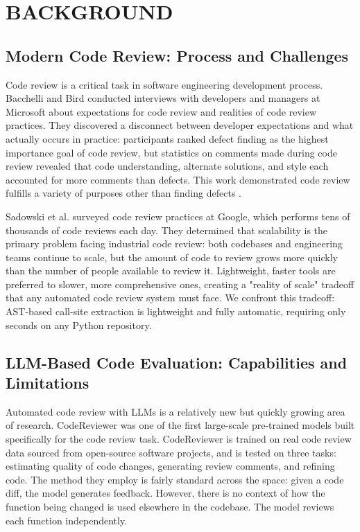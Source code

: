 \documentclass[12pt]{report}
\begin{document}
\chapter{BACKGROUND}

\section{Modern Code Review: Process and Challenges}

Code review is a critical task in software engineering development process. Bacchelli and Bird \cite{bacchelli2013expectations} conducted interviews with developers and managers at Microsoft about expectations for code review and realities of code review practices. They discovered a disconnect between developer expectations and what actually occurs in practice: participants ranked defect finding as the highest importance goal of code review, but statistics on comments made during code review revealed that code understanding, alternate solutions, and style each accounted for more comments than defects. This work demonstrated code review fulfills a variety of purposes other than finding defects .

Sadowski et al. \cite{sadowski2018modern} surveyed code review practices at Google, which performs tens of thousands of code reviews each day. They determined that scalability is the primary problem facing industrial code review: both codebases and engineering teams continue to scale, but the amount of code to review grows more quickly than the number of people available to review it. Lightweight, faster tools are preferred to slower, more comprehensive ones, creating a "reality of scale" tradeoff that any automated code review system must face. We confront this tradeoff: AST-based call-site extraction is lightweight and fully automatic, requiring only seconds on any Python repository.

\section{LLM-Based Code Evaluation: Capabilities and Limitations}

Automated code review with LLMs is a relatively new but quickly growing area of research. CodeReviewer \cite{li2022codereviewer} was one of the first large-scale pre-trained models built specifically for the code review task. CodeReviewer is trained on real code review data sourced from open-source software projects, and is tested on three tasks: estimating quality of code changes, generating review comments, and refining code. The method they employ is fairly standard across the space: given a code diff, the model generates feedback. However, there is no context of how the function being changed is used elsewhere in the codebase. The model reviews each function independently.
\end{document}
